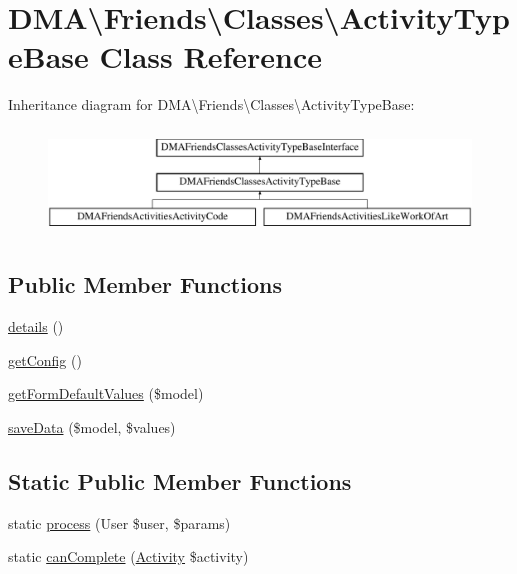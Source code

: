 \hypertarget{classDMA_1_1Friends_1_1Classes_1_1ActivityTypeBase}{\section{D\+M\+A\textbackslash{}Friends\textbackslash{}Classes\textbackslash{}Activity\+Type\+Base Class Reference}
\label{classDMA_1_1Friends_1_1Classes_1_1ActivityTypeBase}
}
Inheritance diagram for D\+M\+A\textbackslash{}Friends\textbackslash{}Classes\textbackslash{}Activity\+Type\+Base\+:\begin{figure}[H]
\begin{center}
\leavevmode
\includegraphics[height=2.837838cm]{d3/d35/classDMA_1_1Friends_1_1Classes_1_1ActivityTypeBase}
\end{center}
\end{figure}
\subsection*{Public Member Functions}
\begin{DoxyCompactItemize}
\item 
\hyperlink{classDMA_1_1Friends_1_1Classes_1_1ActivityTypeBase_a6d83ca41e1c971c65cbc360e6097ad79}{details} ()
\item 
\hyperlink{classDMA_1_1Friends_1_1Classes_1_1ActivityTypeBase_ac540cd6b45fa5f41575523bbb300d18c}{get\+Config} ()
\item 
\hyperlink{classDMA_1_1Friends_1_1Classes_1_1ActivityTypeBase_ae46d0cc7e040eb4166e55a00d8d30dc8}{get\+Form\+Default\+Values} (\$model)
\item 
\hyperlink{classDMA_1_1Friends_1_1Classes_1_1ActivityTypeBase_a69d28814a4cc0c3798d1ab7a95e14ef3}{save\+Data} (\$model, \$values)
\end{DoxyCompactItemize}
\subsection*{Static Public Member Functions}
\begin{DoxyCompactItemize}
\item 
static \hyperlink{classDMA_1_1Friends_1_1Classes_1_1ActivityTypeBase_a772667f95a25c6aa44e31ce9c6903384}{process} (User \$user, \$params)
\item 
static \hyperlink{classDMA_1_1Friends_1_1Classes_1_1ActivityTypeBase_af5ddc6ea4b9d888873e6e499beaea396}{can\+Complete} (\hyperlink{classDMA_1_1Friends_1_1Models_1_1Activity}{Activity} \$activity)
\end{DoxyCompactItemize}
